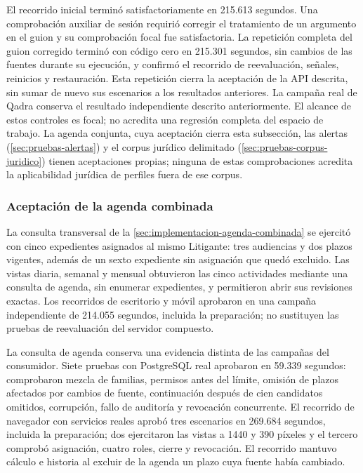 El recorrido inicial terminó satisfactoriamente en 215.613 segundos. Una comprobación auxiliar de sesión requirió corregir el tratamiento de un argumento en el guion y su comprobación focal fue satisfactoria. La repetición completa del guion corregido terminó con código cero en 215.301 segundos, sin cambios de las fuentes durante su ejecución, y confirmó el recorrido de reevaluación, señales, reinicios y restauración. Esta repetición cierra la aceptación de la API descrita, sin sumar de nuevo sus escenarios a los resultados anteriores. La campaña real de Qadra conserva el resultado independiente descrito anteriormente. El alcance de estos controles es focal; no acredita una regresión completa del espacio de trabajo. La agenda conjunta, cuya aceptación cierra esta subsección, las alertas (\cref{sec:pruebas-alertas}) y el corpus jurídico delimitado (\cref{sec:pruebas-corpus-juridico}) tienen aceptaciones propias; ninguna de estas comprobaciones acredita la aplicabilidad jurídica de perfiles fuera de ese corpus.

\subsubsection{Aceptación de la agenda combinada}\label{sec:pruebas-agenda-combinada}

La consulta transversal de la \cref{sec:implementacion-agenda-combinada} se ejercitó con cinco expedientes asignados al mismo Litigante: tres audiencias y dos plazos vigentes, además de un sexto expediente sin asignación que quedó excluido. Las vistas diaria, semanal y mensual obtuvieron las cinco actividades mediante una consulta de agenda, sin enumerar expedientes, y permitieron abrir sus revisiones exactas. Los recorridos de escritorio y móvil aprobaron en una campaña independiente de 214.055 segundos, incluida la preparación; no sustituyen las pruebas de reevaluación del servidor compuesto.

La consulta de agenda conserva una evidencia distinta de las campañas del consumidor. Siete pruebas con PostgreSQL real aprobaron en 59.339 segundos: comprobaron mezcla de familias, permisos antes del límite, omisión de plazos afectados por cambios de fuente, continuación después de cien candidatos omitidos, corrupción, fallo de auditoría y revocación concurrente. El recorrido de navegador con servicios reales aprobó tres escenarios en 269.684 segundos, incluida la preparación; dos ejercitaron las vistas a 1440 y 390 píxeles y el tercero comprobó asignación, cuatro roles, cierre y revocación. El recorrido mantuvo cálculo e historia al excluir de la agenda un plazo cuya fuente había cambiado.

